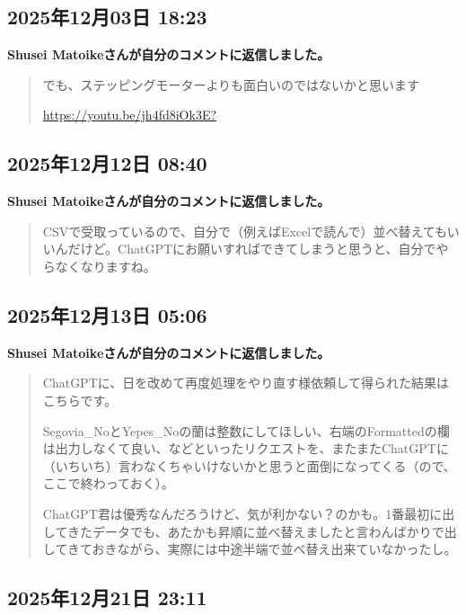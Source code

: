 \subsection*{2025年12月03日 18:23}

\textbf{Shusei Matoikeさんが自分のコメントに返信しました。}

\begin{quote}
でも、ステッピングモーターよりも面白いのではないかと思います

\url{https://youtu.be/jh4fd8iOk3E?}
\end{quote}

\subsection*{2025年12月12日 08:40}

\textbf{Shusei Matoikeさんが自分のコメントに返信しました。}

\begin{quote}
CSVで受取っているので、自分で（例えばExcelで読んで）並べ替えてもいいんだけど。ChatGPTにお願いすればできてしまうと思うと、自分でやらなくなりますね。
\end{quote}

\subsection*{2025年12月13日 05:06}

\textbf{Shusei Matoikeさんが自分のコメントに返信しました。}

\begin{quote}
ChatGPTに、日を改めて再度処理をやり直す様依頼して得られた結果はこちらです。

Segovia\_NoとYepes\_Noの蘭は整数にしてほしい、右端のFormattedの欄は出力しなくて良い、などといったリクエストを、またまたChatGPTに（いちいち）言わなくちゃいけないかと思うと面倒になってくる（ので、ここで終わっておく）。

ChatGPT君は優秀なんだろうけど、気が利かない？のかも。1番最初に出してきたデータでも、あたかも昇順に並べ替えましたと言わんばかりで出してきておきながら、実際には中途半端で並べ替え出来ていなかったし。
\end{quote}

\subsection*{2025年12月21日 23:11}

